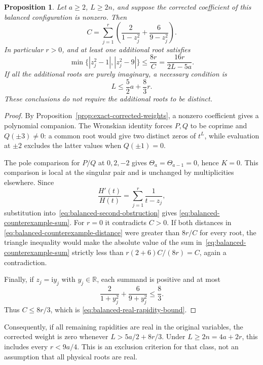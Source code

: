 \documentclass[11pt]{article}
\newtheorem{proposition}{Proposition}[section]
\theoremstyle{definition}
\newcommand{\ii}{\mathrm i}
\begin{document}
\begin{proposition}\label{prop:balanced-counterexample-localization}
Let $a\ge2$, $L\ge2n$, and suppose the corrected coefficient of
this balanced configuration is nonzero. Then
\begin{equation}\label{eq:balanced-counterexample-sum}
 C=\sum_{j=1}^r\left(\frac2{1-z_j^2}+\frac6{9-z_j^2}\right).
\end{equation}
In particular $r>0$, and at least one additional root satisfies
\begin{equation}\label{eq:balanced-counterexample-distance}
 \min\{|z_j^2-1|,|z_j^2-9|\}
 \le\frac{8r}{C}=\frac{16r}{2L-5a}.
\end{equation}
If all the additional roots are purely imaginary, a necessary
condition is
\begin{equation}\label{eq:balanced-real-rapidity-bound}
 L\le\frac52a+\frac83r.
\end{equation}
These conclusions do not require the additional roots to be distinct.
\end{proposition}

\begin{proof}
By Proposition~\ref{prop:exact-corrected-weights}, a nonzero
coefficient gives a polynomial companion. The Wronskian identity
forces $P,Q$ to be coprime and $Q(\pm3)\ne0$: a common root would
give two distinct zeros of $t^L$, while evaluation at $\pm2$
excludes the latter values when $Q(\pm1)=0$.

The pole comparison for $P/Q$ at $0,2,-2$ gives
$\Theta_a=\Theta_{a-1}=0$, hence $K=0$. This comparison is local
at the singular pair and is unchanged by multiplicities elsewhere.
Since
\[
 \frac{H'(t)}{H(t)}=\sum_{j=1}^r\frac1{t-z_j},
\]
substitution into~\eqref{eq:balanced-second-obstruction} gives
\eqref{eq:balanced-counterexample-sum}. For $r=0$ it contradicts
$C>0$. If both distances in
\eqref{eq:balanced-counterexample-distance} were greater than
$8r/C$ for every root, the triangle inequality would make the
absolute value of the sum in~\eqref{eq:balanced-counterexample-sum}
strictly less than $r(2+6)C/(8r)=C$, again a contradiction.

Finally, if $z_j=\ii y_j$ with $y_j\in\mathbb R$, each summand is
positive and at most
\[
 \frac2{1+y_j^2}+\frac6{9+y_j^2}\le\frac83.
\]
Thus $C\le8r/3$, which is
\eqref{eq:balanced-real-rapidity-bound}.
\end{proof}

Consequently, if all remaining rapidities are real in the original
variables, the corrected weight is zero whenever
$L>5a/2+8r/3$. Under $L\ge2n=4a+2r$, this includes every
$r<9a/4$. This is an exclusion criterion for that class, not an
assumption that all physical roots are real.
\end{document}
